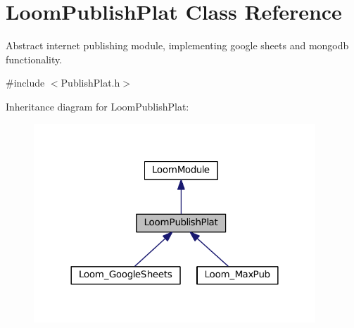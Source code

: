 \hypertarget{class_loom_publish_plat}{}\section{Loom\+Publish\+Plat Class Reference}
\label{class_loom_publish_plat}


Abstract internet publishing module, implementing google sheets and mongodb functionality.  




{\ttfamily \#include $<$Publish\+Plat.\+h$>$}



Inheritance diagram for Loom\+Publish\+Plat\+:\nopagebreak
\begin{figure}[H]
\begin{center}
\leavevmode
\includegraphics[width=300pt]{class_loom_publish_plat__inherit__graph}
\end{center}
\end{figure}
